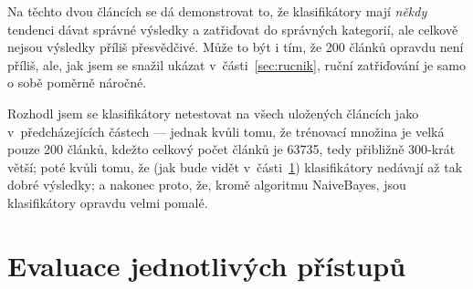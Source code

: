 \documentclass[12pt,a4paper]{report}
\begin{document}
Na těchto dvou článcích se dá demonstrovat to, že klasifikátory mají \emph{někdy} tendenci dávat správné výsledky a zatřiďovat do správných kategorií, ale celkově nejsou výsledky příliš přesvědčivé. Může to být i tím, že 200 článků opravdu není příliš, ale, jak jsem se snažil ukázat v~části~\ref{sec:rucnik}, ruční zatřiďování je samo o sobě poměrně náročné.

Rozhodl jsem se klasifikátory netestovat na všech uložených článcích jako v~předcházejících částech --- jednak kvůli tomu, že trénovací množina je velká pouze 200 článků, kdežto celkový počet článků je 63735, tedy přibližně 300-krát větší; poté kvůli tomu, že (jak bude vidět v~části~\ref{sec:evaluace_jedn_prist}) klasifikátory nedávají až tak dobré výsledky; a nakonec proto, že, kromě algoritmu NaiveBayes, jsou klasifikátory opravdu velmi pomalé.


\section{Evaluace jednotlivých přístupů}

\label{sec:evaluace_jedn_prist}
\end{document}
